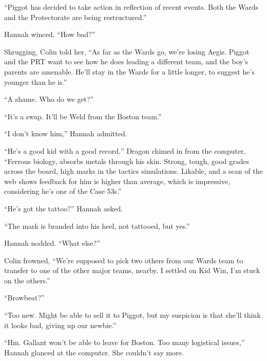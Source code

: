``Piggot has decided to take action in reflection of recent events.  Both the Wards and the Protectorate are being restructured.''



Hannah winced, ``How bad?''



Shrugging, Colin told her, ``As far as the Wards go, we're losing Aegis.  Piggot and the PRT want to see how he does leading a different team, and the boy's parents are amenable.  He'll stay in the Wards for a little longer, to suggest he's younger than he is.''



``A shame.  Who do we get?''



``It's a swap.  It'll be Weld from the Boston team.''



``I don't know him,'' Hannah admitted.



``He's a good kid with a good record,'' Dragon chimed in from the computer, ``Ferrous biology, absorbs metals through his skin.  Strong, tough, good grades across the board, high marks in the tactics simulations.  Likable, and a scan of the web shows feedback for him is higher than average, which is impressive, considering he's one of the Case 53s.''



``He's got the tattoo?'' Hannah asked.



``The mark is branded into his heel, not tattooed, but yes.''



Hannah nodded.  ``What else?''



Colin frowned, ``We're supposed to pick two others from our Wards team to transfer to one of the other major teams, nearby.  I settled on Kid Win, I'm stuck on the others.''



``Browbeat?''



``Too new.  Might be able to sell it to Piggot, but my suspicion is that she'll think it looks bad, giving up our newbie.''



``Hm.  Gallant won't be able to leave for Boston.  Too many logistical issues,'' Hannah glanced at the computer.  She couldn't say more.



